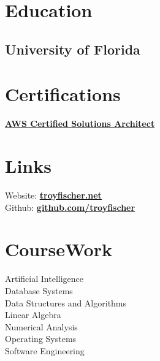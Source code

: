 \documentclass[letterpaper]{deedy-resume}
\date{}
\title{}
\begin{document}

\begin{minipage}[t]{0.33\textwidth} %
\section{Education}
\subsection{University of Florida}

\sectionspace %

\section{Certifications}
\href{https://www.credly.com/badges/6cfa3e1d-b75e-4a53-a16b-acdf66ca04e3/public_url}{\underline{\textbf{AWS Certified Solutions Architect}}}

\sectionspace
\section{Links}
Website: \href{https://troyfischer.net}{\underline{\textbf{troyfischer.net}}} \\
Github: \href{https://github.com/troyfischer}{\underline{\textbf{github.com/troyfischer}}} \\
\sectionspace
\section{CourseWork}
Artificial Intelligence \\
Database Systems \\
Data Structures and Algorithms \\
Linear Algebra \\
Numerical Analysis \\
Operating Systems \\
Software Engineering \\
\sectionspace

\end{minipage}
\end{document}
